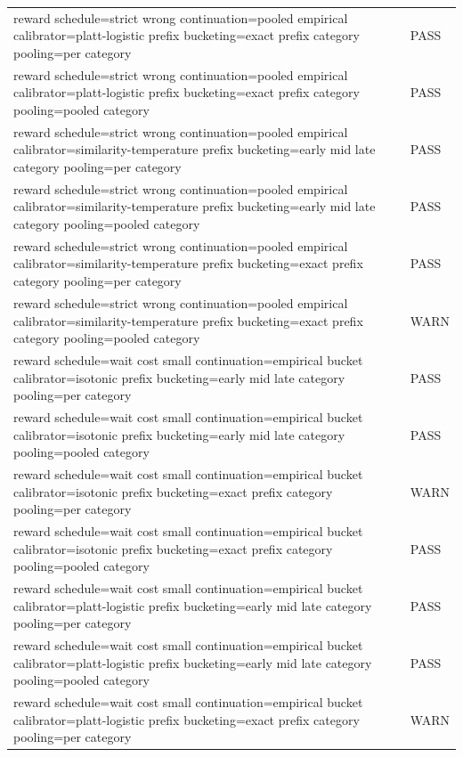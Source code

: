 \begin{table}[h]
\begin{tabular}{ll}
reward schedule=strict wrong  continuation=pooled empirical  calibrator=platt-logistic  prefix bucketing=exact prefix  category pooling=per category & PASS \\
reward schedule=strict wrong  continuation=pooled empirical  calibrator=platt-logistic  prefix bucketing=exact prefix  category pooling=pooled category & PASS \\
reward schedule=strict wrong  continuation=pooled empirical  calibrator=similarity-temperature  prefix bucketing=early mid late  category pooling=per category & PASS \\
reward schedule=strict wrong  continuation=pooled empirical  calibrator=similarity-temperature  prefix bucketing=early mid late  category pooling=pooled category & PASS \\
reward schedule=strict wrong  continuation=pooled empirical  calibrator=similarity-temperature  prefix bucketing=exact prefix  category pooling=per category & PASS \\
reward schedule=strict wrong  continuation=pooled empirical  calibrator=similarity-temperature  prefix bucketing=exact prefix  category pooling=pooled category & WARN \\
reward schedule=wait cost small  continuation=empirical bucket  calibrator=isotonic  prefix bucketing=early mid late  category pooling=per category & PASS \\
reward schedule=wait cost small  continuation=empirical bucket  calibrator=isotonic  prefix bucketing=early mid late  category pooling=pooled category & PASS \\
reward schedule=wait cost small  continuation=empirical bucket  calibrator=isotonic  prefix bucketing=exact prefix  category pooling=per category & WARN \\
reward schedule=wait cost small  continuation=empirical bucket  calibrator=isotonic  prefix bucketing=exact prefix  category pooling=pooled category & PASS \\
reward schedule=wait cost small  continuation=empirical bucket  calibrator=platt-logistic  prefix bucketing=early mid late  category pooling=per category & PASS \\
reward schedule=wait cost small  continuation=empirical bucket  calibrator=platt-logistic  prefix bucketing=early mid late  category pooling=pooled category & PASS \\
reward schedule=wait cost small  continuation=empirical bucket  calibrator=platt-logistic  prefix bucketing=exact prefix  category pooling=per category & WARN \\

\end{tabular}
\end{table}
